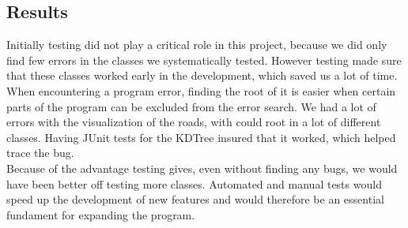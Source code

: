 \documentclass[a4paper,10pt,titlepage]{article}
\begin{document}
		\subsection{Results}
		Initially testing did not play a critical role in this project, because we did only find few errors in the classes we systematically tested. However testing made sure that these classes worked early in the development, which saved us a lot of time. When encountering a program error, finding the root of it is easier when certain parts of the program can be excluded from the error search. We had a lot of errors with the visualization of the roads, with could root in a lot of different classes. Having JUnit tests for the KDTree insured that it worked, which helped trace the bug.\\
		Because of the advantage testing gives, even without finding any bugs, we would have been better off testing more classes. Automated and manual tests would speed up the development of new features and would therefore be an essential fundament for expanding the program. 

			
	\newpage
\end{document}

